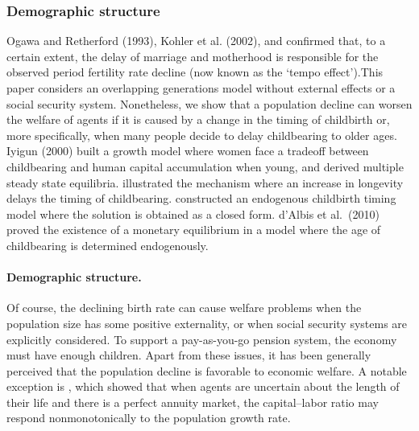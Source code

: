 \documentclass{MBE}%
\begin{document}
{\subsubsection{Demographic structure}
Ogawa and Retherford (1993), Kohler et al. (2002), and \citep{Miller:1974} confirmed that, to a
certain extent, the delay of marriage and motherhood is responsible for the observed period
fertility rate decline (now known as the `tempo effect').This paper considers an overlapping
generations model without external effects or a social security system. Nonetheless, we show that
a population decline can worsen the welfare of agents if it is caused by a change in the timing of
childbirth or, more specifically, when many people decide to delay childbearing to older ages.
Iyigun (2000) built a growth model where women face a tradeoff between childbearing and human
capital accumulation when young, and derived multiple steady state equilibria.
\citet{Vandenkoornhuyse_Baldauf_Leyval_Straczek_Young:2002} illustrated the mechanism where an
increase in longevity delays the timing of childbearing. \citet{Guindon_Gascuel:2003} constructed
an endogenous childbirth timing model where the solution is obtained as a closed form. d'Albis et
al.\ (2010) proved the existence of a monetary equilibrium in a model where the age of
childbearing is determined endogenously.
%
%
%



\paragraph{Demographic structure.} Of course, the declining birth rate can cause welfare problems when the
population size has some positive externality, or when social security systems are explicitly
considered. {To support a pay-as-you-go pension system, the economy must have enough children.}
Apart from these issues, it has been generally perceived that the population decline is favorable
to economic welfare. {A notable exception is \citep{Felsenstein:2004}, which showed that when
agents are uncertain about the length of their life and there is a perfect annuity market, the
capital--labor ratio may respond nonmonotonically to the population growth rate.}



}
\end{document}
